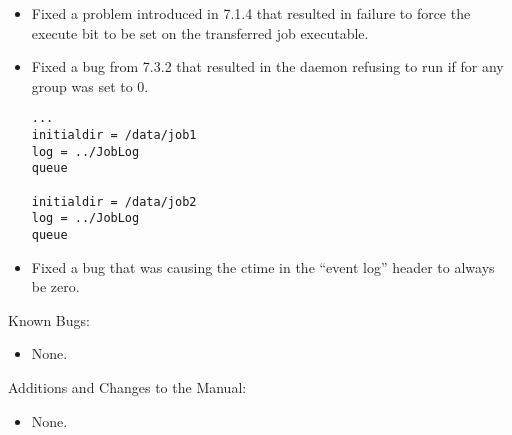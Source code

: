 \begin{itemize}
\item Fixed a problem introduced in 7.1.4 that resulted in failure to force
the execute bit to be set on the transferred job executable.

\item Fixed a bug from 7.3.2 that resulted in the  daemon
refusing to run if  for any group was set to 0.

\begin{verbatim}
...
initialdir = /data/job1
log = ../JobLog
queue

initialdir = /data/job2
log = ../JobLog
queue
\end{verbatim}

\item Fixed a bug that was causing the ctime in the ``event log'' header
  to always be zero.

\end{itemize}

\noindent Known Bugs:

\begin{itemize}

\item None.

\end{itemize}

\noindent Additions and Changes to the Manual:

\begin{itemize}

\item None.

\end{itemize}


